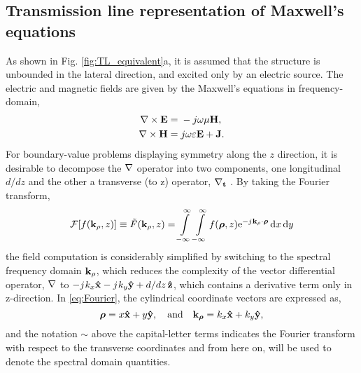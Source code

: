 \subsection{Transmission line representation of Maxwell's equations}
%
As shown in Fig. \ref{fig:TL_equivalent}a, it is assumed that the structure is unbounded in the lateral direction, and excited only by an electric source. The electric and magnetic fields are given by the Maxwell's equations in frequency-domain,
%
\begin{subequations}
  \begin{align}
    \nabla \times{\mathbf{E}} ={}& -j \omega \mu \mathbf{H},
    \label{eq:E}\\
    \nabla \times{\mathbf{H}} ={}& j \omega \varepsilon \mathbf{E} + \mathbf{J}.
    \label{eq:H}
  \end{align}
  \label{eq:MaxE}%
\end{subequations}
%
For boundary-value problems displaying symmetry along the $z$ direction, it is desirable to decompose the $\mathbf{\nabla}$ operator into two components, one longitudinal $d/dz$ and the other a transverse (to z) operator, $\mathbf{\nabla_t}$ \cite[p. 64]{Felsen1994}. By taking the Fourier transform,
%
\begin{equation}
  \mathcal{F}[f(\mathbf{k}_{\rho},z)] \equiv \tilde{F}(\mathbf{k}_{\rho},z) = \int\limits_{-\infty}^\infty \int\limits_{-\infty}^\infty
  f({\boldsymbol {\rho}},z) \mathrm{e}^{-{j}\mkern1mu \mathbf{k}_{\rho} \cdot {\boldsymbol {\rho}}} \mathop{}\!\mathrm{d}{x} \mathop{}\!\mathrm{d}{y}
  \label{eq:Fourier}
\end{equation}
%
the field computation is considerably simplified by switching to the spectral frequency domain $\mathbf{k}_{\rho}$, which reduces the complexity of the vector differential operator, $\mathbf{\nabla}$ to $-{j}\mkern1mu k_x \mathbf{\hat{x}} - {j}\mkern1mu k_y \mathbf{\hat{y}} + d/dz\, \mathbf{\hat{z}}$, which contains a derivative term only in z-direction. In \eqref{eq:Fourier}, the cylindrical coordinate vectors are expressed as,
%
\begin{equation}
  {\boldsymbol {\rho}} = x\mathbf{\hat{x}} + y\mathbf{\hat{y}}, \quad \text{and} \quad
  \mathbf{k_{\boldsymbol {\rho}}} = k_x\mathbf{\hat{x}} + k_y\mathbf{\hat{y}},
  \label{eq:rect2cylindrical}
\end{equation}
%
and the notation $\sim$ above the capital-letter terms indicates the Fourier transform with respect to the transverse coordinates and from here on, will be used to denote the spectral domain quantities.

